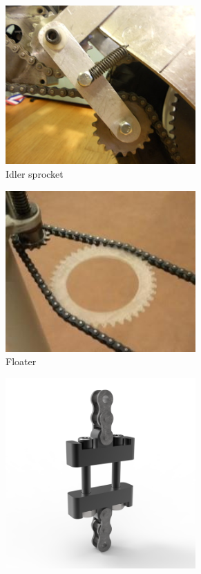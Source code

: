 \documentclass[10pt,letterpaper]{book}
\begin{document}
\begin{figure}[H]
	\begin{subfigure}[b]{.32\linewidth}
		\includegraphics[width=0.8\textwidth]{imgs/chain_idler.jpeg}
		\caption{Idler sprocket}
	\end{subfigure}\begin{subfigure}[b]{.32\linewidth}
		\includegraphics[width=0.8\textwidth]{imgs/chain_floater.jpeg}
		\caption{Floater}
	\end{subfigure}\begin{subfigure}[b]{.32\linewidth}
		\includegraphics[width=0.8\textwidth]{imgs/chain_inlinetens.png}

\end{subfigure}
\end{figure}
\end{document}
